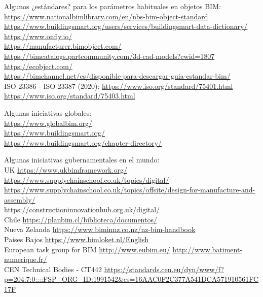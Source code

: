 \documentclass[spanish,12pt,a4paper,final,oneside]{book}
\begin{document}
\vspace{0.3cm}
Algunos ¿estándares? para los parámetros habituales en objetos BIM:
\\ \url{https://www.nationalbimlibrary.com/en/nbs-bim-object-standard}
\\ \url{https://www.buildingsmart.org/users/services/buildingsmart-data-dictionary/}
\\ \url{https://www.onfly.io/}
\\ \url{https://manufacturer.bimobject.com/}
\\ \url{https://bimcatalogs.partcommunity.com/3d-cad-models?cwid=1807}
\\ \url{https://ecobject.com/}
\\ \url{https://bimchannel.net/es/disponible-para-descargar-guia-estandar-bim/}
\\ISO 23386 - ISO 23387 (2020): \url{https://www.iso.org/standard/75401.html} \url{https://www.iso.org/standard/75403.html}

\vspace{0.3cm}
Algunas iniciativas globales:
\\ \url{https://www.globalbim.org/}
\\ \url{https://www.buildingsmart.org/} 
\\ \url{https://www.buildingsmart.org/chapter-directory/}

\vspace{0.3cm}
Algunas iniciativas gubernamentales en el mundo:
\\ UK \url{https://www.ukbimframework.org/}
\\ \url{https://www.supplychainschool.co.uk/topics/digital/}
\\ \url{https://www.supplychainschool.co.uk/topics/offsite/design-for-manufacture-and-assembly/}
\\ \url{https://constructioninnovationhub.org.uk/digital/}
\\ Chile \url{https://planbim.cl/biblioteca/documentos/}
\\ Nueva Zelanda \url{https://www.biminnz.co.nz/nz-bim-handbook}
\\ Paises Bajos \url{https://www.bimloket.nl/English}
\\ European task group for BIM  \url{http://www.eubim.eu/}
\url{http://www.batiment-numerique.fr/}
\\ CEN Technical Bodies - CT442 \url{https://standards.cen.eu/dyn/www/f?p=204:7:0::::FSP_ORG_ID:1991542&cs=16AAC0F2C377A541DCA571910561FC17F}
\end{document}
